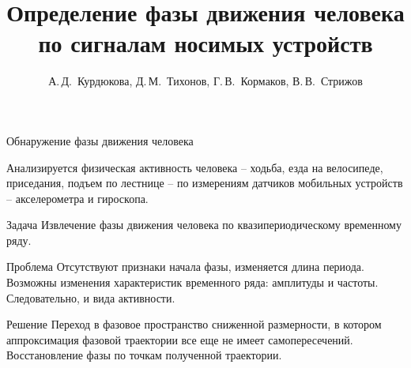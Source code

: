 \documentclass{beamer}
\title[\hbox to 56mm{Определение фазы}]{Определение фазы движения человека\\по сигналам носимых устройств}
\author[А.\,Д.~Курдюкова, Д.\,М.~Тихонов, Г.\,В.~Кормаков, В.\,В.~Стрижов ]{А.\,Д.~Курдюкова, Д.\,М.~Тихонов, Г.\,В.~Кормаков, В.\,В.~Стрижов
}
\institute{Московский физико-технический институт}
\date{\footnotesize
\par\bigskip\small 2021}
\begin{document}
\begin{frame}
\thispagestyle{empty}
\maketitle
\end{frame}
\begin{frame}{Обнаружение фазы движения человека}

Анализируется физическая активность человека -- ходьба, езда на велосипеде, приседания, подъем по лестнице -- по измерениям датчиков мобильных устройств -- акселерометра и гироскопа.

\begin{alertblock}{Задача}
Извлечение фазы движения человека по квазипериодическому временному ряду.
\end{alertblock}

\begin{alertblock}{Проблема}
Отсутствуют признаки начала фазы, изменяется длина периода. Возможны изменения характеристик временного ряда: амплитуды и частоты. Следовательно, и вида активности. 
\end{alertblock}

\begin{alertblock}{Решение}
Переход в фазовое пространство сниженной размерности, в котором аппроксимация фазовой траектории все еще не имеет самопересечений. Восстановление фазы по точкам полученной траектории. 
\end{alertblock}

\end{frame}
\end{document}
